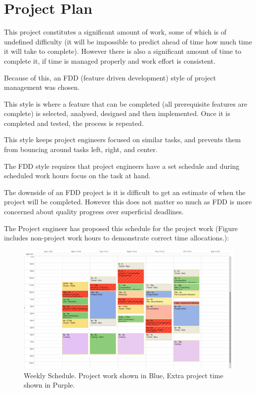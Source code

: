\documentclass[a4paper]{report}
\begin{document}
\chapter{Project Plan}

This project constitutes a significant amount of work, some of which is of undefined difficulty (it will be impossible to predict ahead of time how much time it will take to complete). However there is also a significant amount of time to complete it, if time is managed properly and work effort is consistent.

Because of this, an FDD (feature driven development) style of project management was chosen.

This style is where a feature that can be completed (all prerequisite features are complete) is selected, analysed, designed and then implemented. Once it is completed and tested, the process is repeated.

This style keeps project engineers focused on similar tasks, and prevents them from bouncing around tasks left, right, and center.

The FDD style requires that project engineers have a set schedule and during scheduled work hours focus on the task at hand.

The downside of an FDD project is it is difficult to get an estimate of when the project will be completed. However this does not matter so much as FDD is more concerned about quality progress over superficial deadlines.

The Project engineer has proposed this schedule for the project work (Figure includes non-project work hours to demonstrate correct time allocations.):


\begin{figure}[ht]
\centering
\includegraphics[width=450px]{images/schedule_screenshot}
\caption{Weekly Schedule. Project work shown in Blue, Extra project time shown in Purple.}
\label{fig:schedulerscreen}
\end{figure}
\end{document}
